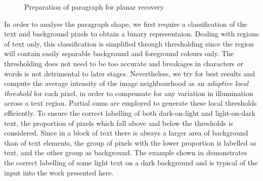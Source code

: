 \begin{figure}[h]
\begin{centering}
  \hspace*{1mm}
  \hspace*{1mm}
\label{runprep}
\caption{Preparation of paragraph for planar recovery}
\end{centering}
\end{figure}

In order to analyse the paragraph shape, we first require a classification of
the text and background pixels to obtain a binary representaion.  Dealing with regions of text only, this
classification is simplified through thresholding since the region will contain
easily separable background and foreground colours only. The thresholding does not
need to be too accurate and breakages in characters or words is not detrimental
to later stages. Nevertheless, we try for best results and  compute the average
intensity of the image neighbourhood as an {\em adaptive local threshold}
for each pixel, in
order to compensate for any variation in illumination across a text region.
Partial sums \cite{partialSums} are employed to generate these local thresholds
efficiently.  To ensure the correct labelling of both dark-on-light and
light-on-dark text, the proportion of pixels which fall above and below the
thresholds is considered.  Since in a block of text there is always a larger
area of background than of text elements, the group of pixels with the lower
proportion is labelled as text, and the other group as background.  The example
shown in  demonstrates the correct labelling of some light text
on a dark background and is typical of the input into the work presented here.


